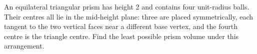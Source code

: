 An equilateral triangular prism has height 2 and contains four unit-radius balls. Their centres all lie in the mid-height plane: three are placed symmetrically, each tangent to the two vertical faces near a different base vertex, and the fourth centre is the triangle centre. Find the least possible prism volume under this arrangement.
